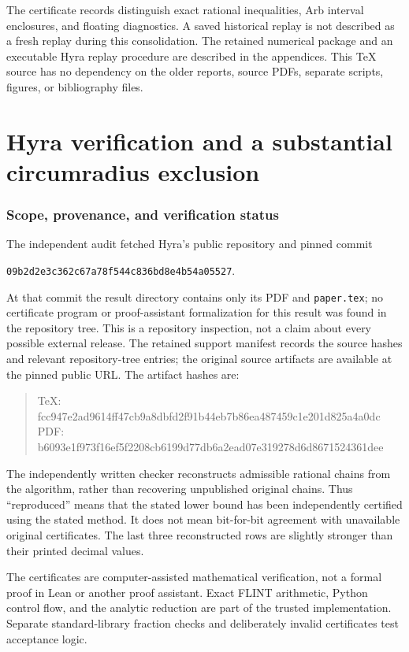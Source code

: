 \documentclass[11pt]{article}
\theoremstyle{remark}\newtheorem{remark}[theorem]{Remark}
\begin{document}
The certificate records distinguish exact rational inequalities, Arb interval enclosures, and floating diagnostics. A saved historical replay is not described as a fresh replay during this consolidation. The retained numerical package and an executable Hyra replay procedure are described in the appendices. This TeX source has no dependency on the older reports, source PDFs, separate scripts, figures, or bibliography files.

\part{Hyra verification and a substantial circumradius exclusion}

\section{Scope, provenance, and verification status}
The independent audit fetched Hyra's public repository \cite{Hyra} and pinned commit
\begin{center}\small\texttt{09b2d2e3c362c67a78f544c836bd8e4b54a05527}.\end{center}
At that commit the result directory contains only its PDF and \texttt{paper.tex}; no certificate program or proof-assistant formalization for this result was found in the repository tree. This is a repository inspection, not a claim about every possible external release. The retained support manifest records the source hashes and relevant repository-tree entries; the original source artifacts are available at the pinned public URL. The artifact hashes are:
\begin{quote}\scriptsize\ttfamily
TeX: fcc947e2ad9614ff47cb9a8dbfd2f91b44eb7b86ea487459c1e201d825a4a0dc\\
PDF: b6093e1f973f16ef5f2208cb6199d77db6a2ead07e319278d6d8671524361dee
\end{quote}
The independently written checker reconstructs admissible rational chains from the algorithm, rather than recovering unpublished original chains. Thus ``reproduced'' means that the stated lower bound has been independently certified using the stated method. It does not mean bit-for-bit agreement with unavailable original certificates. The last three reconstructed rows are slightly stronger than their printed decimal values.


The certificates are computer-assisted mathematical verification, not a formal proof in Lean or another proof assistant. Exact FLINT arithmetic, Python control flow, and the analytic reduction are part of the trusted implementation. Separate standard-library fraction checks and deliberately invalid certificates test acceptance logic.
\end{document}
